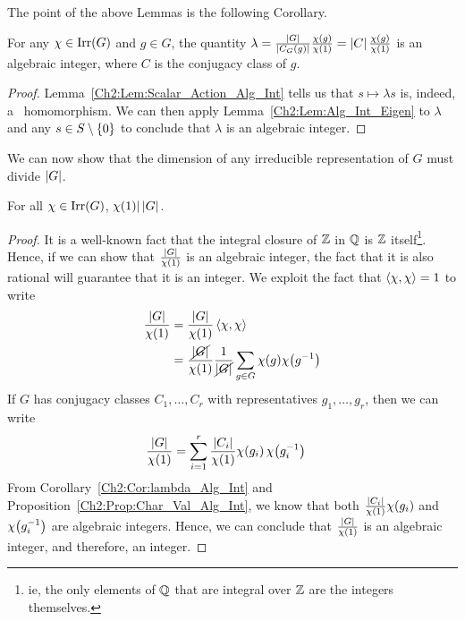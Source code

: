 The point of the above Lemmas is the following Corollary.

\begin{corollary}\label{Ch2:Cor:lambda_Alg_Int}
    For any $\chi \in \operatorname{Irr}\!\left( G \right)$ and $g \in G$, the quantity $\lambda = \frac{\left\lvert G \right\rvert}{\left\lvert C_G(g) \right\rvert} \frac{\chi(g)}{\chi(1)} = \left\lvert C \right\rvert \frac{\chi(g)}{\chi(1)}$ is an algebraic integer, where $C$ is the conjugacy class of $g$.
\end{corollary}
\begin{proof}
    Lemma~\ref{Ch2:Lem:Scalar_Action_Alg_Int} tells us that $s \mapsto \lambda s$ is, indeed, a \CGM\ homomorphism. We can then apply Lemma~\ref{Ch2:Lem:Alg_Int_Eigen} to $\lambda$ and any $s \in S \setminus \left\{ 0 \right\}$ to conclude that $\lambda$ is an algebraic integer.
\end{proof}

We can now show that the dimension of any irreducible representation of $G$ must divide $\left\lvert G \right\rvert$.

\begin{boxtheorem}\label{Ch2:Thm:Char_div_Ord_Grp}
    For all $\chi \in \operatorname{Irr}\!\left( G \right)$, $\chi(1) \vert \left\lvert G \right\rvert$.
\end{boxtheorem}
\begin{proof}
    It is a well-known fact that the integral closure of $\mathbb{Z}$ in $\mathbb{Q}$ is $\mathbb{Z}$ itself\footnote{ie, the only elements of $\mathbb{Q}$ that are integral over $\mathbb{Z}$ are the integers themselves.}. Hence, if we can show that $\frac{\left\lvert G \right\rvert}{\chi(1)}$ is an algebraic integer, the fact that it is also rational will guarantee that it is an integer. We exploit the fact that $\left\langle \chi, \chi \right\rangle = 1$ to write
    \begin{align*}
        \frac{\left\lvert G \right\rvert}{\chi(1)} &= \frac{\left\lvert G \right\rvert}{\chi(1)} \left\langle \chi, \chi \right\rangle \\
        &= \frac{\cancel{\left\lvert G \right\rvert}}{\chi(1)} \frac{1}{\cancel{\left\lvert G \right\rvert}} \sum_{g \in G} \chi(g)\chi\!\left( g^{-1} \right)
    \end{align*}
    If $G$ has conjugacy classes $C_1, \ldots, C_r$ with representatives $g_1, \ldots, g_r$, then we can write
    \begin{align*}
        \frac{\left\lvert G \right\rvert}{\chi(1)} &= \sum_{i=1}^{r} \frac{\left\lvert C_i \right\rvert}{\chi(1)}\chi\!\left( g_i \right)\chi\!\left( g_i^{-1} \right)
    \end{align*}
    From Corollary~\ref{Ch2:Cor:lambda_Alg_Int} and Proposition~\ref{Ch2:Prop:Char_Val_Alg_Int}, we know that both $\frac{\left\lvert C_i \right\rvert}{\chi(1)}\chi\!\left( g_i \right)$ and $\chi\!\left( g_i^{-1} \right)$ are algebraic integers. Hence, we can conclude that $\frac{\left\lvert G \right\rvert}{\chi(1)}$ is an algebraic integer, and therefore, an integer.
\end{proof}

